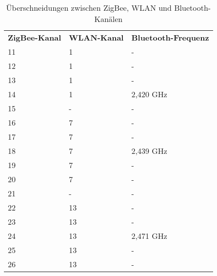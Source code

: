                 \begin{table}
                    \begin{tabular}{lll}
                        \textbf{ZigBee-Kanal} & \textbf{WLAN-Kanal} & \textbf{Bluetooth-Frequenz} \\
                        11           & 1          & -\\
                        12           & 1          & -\\
                        13           & 1          & -\\
                        14           & 1          & 2,420 GHz\\
                        15           & -          & -\\
                        16           & 7          & -\\
                        17           & 7          & -\\
                        18           & 7          & 2,439 GHz\\
                        19           & 7          & -\\
                        20           & 7          & -\\
                        21           & -          & -\\
                        22           & 13         & -\\
                        23           & 13         & -\\
                        24           & 13         & 2,471 GHz\\
                        25           & 13         & -\\
                        26           & 13         & -\\
                    \end{tabular}
                    \caption{Überschneidungen zwischen ZigBee, WLAN und Bluetooth-Kanälen}
                    \label{zigbee_wlan_kanaele}
                \end{table}




